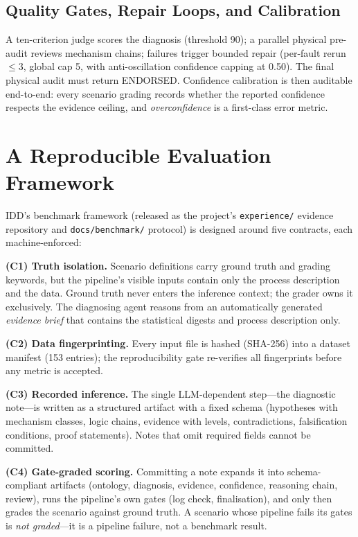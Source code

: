 \documentclass[journal]{IEEEtran}
\begin{document}
\subsection{Quality Gates, Repair Loops, and Calibration}
A ten-criterion judge scores the diagnosis (threshold 90); a parallel physical pre-audit reviews mechanism chains; failures trigger bounded repair (per-fault rerun $\le$3, global cap 5, with anti-oscillation confidence capping at 0.50). The final physical audit must return ENDORSED. Confidence calibration is then auditable end-to-end: every scenario grading records whether the reported confidence respects the evidence ceiling, and \emph{overconfidence} is a first-class error metric.

\section{A Reproducible Evaluation Framework}
\label{sec:framework}

IDD's benchmark framework (released as the project's \texttt{experience/} evidence repository and \texttt{docs/benchmark/} protocol) is designed around five contracts, each machine-enforced:

\textbf{(C1) Truth isolation.} Scenario definitions carry ground truth and grading keywords, but the pipeline's visible inputs contain only the process description and the data. Ground truth never enters the inference context; the grader owns it exclusively. The diagnosing agent reasons from an automatically generated \emph{evidence brief} that contains the statistical digests and process description only.

\textbf{(C2) Data fingerprinting.} Every input file is hashed (SHA-256) into a dataset manifest (153 entries); the reproducibility gate re-verifies all fingerprints before any metric is accepted.

\textbf{(C3) Recorded inference.} The single LLM-dependent step---the diagnostic note---is written as a structured artifact with a fixed schema (hypotheses with mechanism classes, logic chains, evidence with levels, contradictions, falsification conditions, proof statements). Notes that omit required fields cannot be committed.

\textbf{(C4) Gate-graded scoring.} Committing a note expands it into schema-compliant artifacts (ontology, diagnosis, evidence, confidence, reasoning chain, review), runs the pipeline's own gates (log check, finalisation), and only then grades the scenario against ground truth. A scenario whose pipeline fails its gates is \emph{not graded}---it is a pipeline failure, not a benchmark result.
\end{document}
